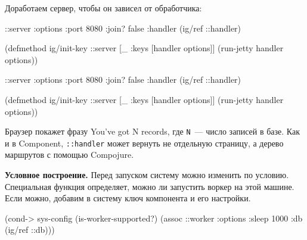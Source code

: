 \else

\begin{english}
\end{english}

\fi

\noindent
Доработаем сервер, чтобы он зависел от обработчика:

\ifx\DEVICETYPE\MOBILE

\begin{english}
  \begin{clojure}
{::server {:options {:port 8080
                     :join? false}
           :handler (ig/ref ::handler)}}

(defmethod ig/init-key ::server
  [_ {:keys [handler options]}]
  (run-jetty handler options))
  \end{clojure}
\end{english}

\else

\begin{english}
  \begin{clojure}
{::server {:options {:port 8080 :join? false}
           :handler (ig/ref ::handler)}}

(defmethod ig/init-key ::server
  [_ {:keys [handler options]}]
  (run-jetty handler options))
  \end{clojure}
\end{english}

\fi

Браузер покажет фразу You've got N records, где \verb|N|~--- число записей
в базе. Как и в Component, \verb|::handler| может вернуть не отдельную
страницу, а дерево маршрутов с помощью Compojure.


\textbf{Условное построение.} Перед запуском систему можно изменить по
условию. Специальная функция определяет, можно ли запустить воркер на этой
машине. Если можно, добавим в систему ключ компонента и его настройки.

\begin{english}
  \begin{clojure}
(cond-> sys-config
  (is-worker-supported?)
  (assoc ::worker {:options {:sleep 1000}
                   :db (ig/ref ::db)}))
  \end{clojure}
\end{english}

